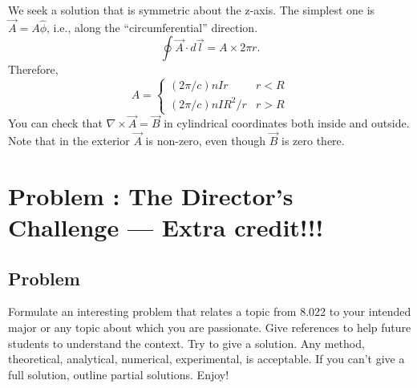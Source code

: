 \documentclass[solutions]{esg8022pset}
\begin{document}
  We seek a solution that is symmetric about the z-axis.  The simplest one is
  $\vec{A}=A\hat\phi$, i.e., along the ``circumferential'' direction.
  \[ \oint \vec{A}\cdot d\vec{l} = A\times 2\pi r.\]
  Therefore,
  \begin{equation}
    A = \begin{cases} (2\pi/c)nIr & r<R\\ (2\pi/c)nIR^2/r & r>R \end{cases}
  \end{equation}
  You can check  that $\nabla\times \vec{A}=\vec{B}$ in cylindrical coordinates
  both inside and outside.  Note that in the exterior $\vec{A}$ is non-zero,
  even though $\vec{B}$ is zero there.
\section{Problem \thesection: The Director's Challenge --- Extra credit!!!}
\subsection{Problem}
  Formulate an interesting problem that relates a topic from 8.022 to your
  intended major or any topic about which you are passionate.  Give references
  to help future students to understand the context.  Try to give a solution.
  Any method, theoretical, analytical, numerical, experimental, is acceptable.
  If you can't give a full solution, outline partial solutions. Enjoy!
\end{document}
